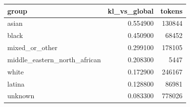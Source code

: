 \begin{tabular}{lrr}
\toprule
group & kl_vs_global & tokens \\
\midrule
asian & 0.554900 & 130844 \\
black & 0.450900 & 68452 \\
mixed_or_other & 0.299100 & 178105 \\
middle_eastern_north_african & 0.208300 & 5447 \\
white & 0.172900 & 246167 \\
latina & 0.128800 & 86981 \\
unknown & 0.083300 & 778026 \\
\bottomrule
\end{tabular}
